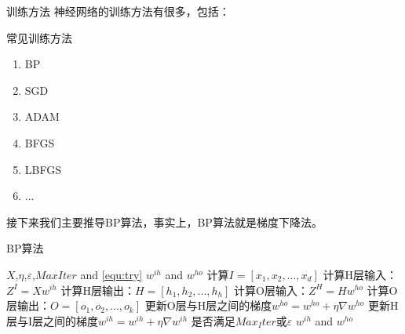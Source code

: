 \documentclass[hyperref,UTF8,11pt]{beamer}
\begin{document}

\begin{frame}{训练方法}
神经网络的训练方法有很多，包括：
	\begin{block}{常见训练方法}
		\begin{enumerate}
			\item BP
			\item SGD
			\item ADAM
			\item BFGS
			\item LBFGS
			\item ...
		\end{enumerate}	
	\end{block}
	接下来我们主要推导BP算法，事实上，BP算法就是梯度下降法。
\end{frame}


\begin{frame}{BP算法}
    \begin{algorithm}[H]
        \caption{BP算法}\label{alg:em}
        \begin{algorithmic}[1]
            \REQUIRE $X$,$\eta$,$\varepsilon$,$Max	Iter$ and \eqref{equ:try}
            \ENSURE $w^{ih}$ and $w^{ho}$
            \REPEAT
            \STATE 计算$I=[x_1,x_2,...,x_d]$
			\STATE 计算H层输入：$Z^I=Xw^{ih}$
			\STATE 计算H层输出：$H=[h_1,h_2,...,h_h]$
			\STATE 计算O层输入：$Z^H=Hw^{ho}$
			\STATE 计算O层输出：$O=[o_1,o_2,...,o_k]$
			\STATE 更新O层与H层之间的梯度${w^{ho}} = {w^{ho}} + \eta \nabla {w^{ho}}$
			\STATE 更新H层与I层之间的梯度${w^{ih}} = {w^{ih}} + \eta \nabla {w^{ih}}$
            \UNTIL 是否满足$Max_Iter$或$\varepsilon$
            \RETURN $w^{ih}$ and $w^{ho}$
        \end{algorithmic}
    \end{algorithm} 
\end{frame}
\end{document}
